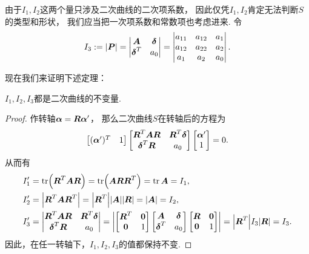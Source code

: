 由于\(I_1,I_2\)这两个量只涉及二次曲线的二次项系数，
因此仅凭\(I_1,I_2\)肯定无法判断\(S\)的类型和形状，
我们应当把一次项系数和常数项也考虑进来.
令\begin{equation}
	I_3 := \abs{\boldsymbol{P}}
	= \begin{vmatrix}
		\boldsymbol{A} & \boldsymbol\delta \\
		\boldsymbol\delta^T & a_0
	\end{vmatrix}
	= \begin{vmatrix}
		a_{11} & a_{12} & a_1 \\
		a_{12} & a_{22} & a_2 \\
		a_1 & a_2 & a_0
	\end{vmatrix}.
\end{equation}

现在我们来证明下述定理：
\begin{theorem}
\(I_1,I_2,I_3\)都是二次曲线的不变量.
\begin{proof}
作转轴\(\boldsymbol\alpha = \boldsymbol{R} \boldsymbol\alpha'\)，
那么二次曲线\(S\)在转轴后的方程为\begin{equation*}
	\begin{bmatrix}
		(\boldsymbol\alpha')^T & 1
	\end{bmatrix}
	\begin{bmatrix}
		\boldsymbol{R}^T \boldsymbol{A} \boldsymbol{R} & \boldsymbol{R}^T \boldsymbol\delta \\
		\boldsymbol\delta^T \boldsymbol{R} & a_0
	\end{bmatrix}
	\begin{bmatrix}
		\boldsymbol\alpha' \\ 1
	\end{bmatrix}
	= 0.
\end{equation*}
从而有\begin{align*}
	I_1'
	&= \tr(\boldsymbol{R}^T \boldsymbol{A} \boldsymbol{R})
	= \tr(\boldsymbol{A} \boldsymbol{R} \boldsymbol{R}^T)
	= \tr\boldsymbol{A}
	= I_1, \\
	I_2'
	&= \abs{\boldsymbol{R}^T \boldsymbol{A} \boldsymbol{R}^T}
	= \abs{\boldsymbol{R}^T} \abs{\boldsymbol{A}} \abs{\boldsymbol{R}}
	= \abs{\boldsymbol{A}}
	= I_2, \\
	I_3'
	&= \begin{vmatrix}
		\boldsymbol{R}^T \boldsymbol{A} \boldsymbol{R} & \boldsymbol{R}^T \boldsymbol\delta \\
		\boldsymbol\delta^T \boldsymbol{R} & a_0
	\end{vmatrix}
	= \abs{
		\begin{bmatrix}
			\boldsymbol{R}^T & \boldsymbol0 \\
			\boldsymbol0 & 1
		\end{bmatrix}
		\begin{bmatrix}
			\boldsymbol{A} & \boldsymbol\delta \\
			\boldsymbol\delta^T & a_0
		\end{bmatrix}
		\begin{bmatrix}
			\boldsymbol{R} & \boldsymbol0 \\
			\boldsymbol0 & 1
		\end{bmatrix}
	}
	= \abs{\boldsymbol{R}^T} I_3 \abs{\boldsymbol{R}}
	= I_3.
\end{align*}
因此，在任一转轴下，\(I_1,I_2,I_3\)的值都保持不变.


\end{proof}
\end{theorem}
